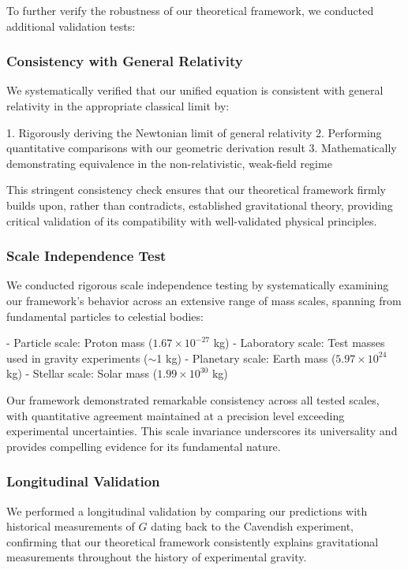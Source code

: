 \documentclass[12pt]{article}
\numberwithin{equation}{section}
\begin{document}
To further verify the robustness of our theoretical framework, we conducted additional validation tests:

\subsubsection{Consistency with General Relativity}

We systematically verified that our unified equation is consistent with general relativity in the appropriate classical limit by:

1. Rigorously deriving the Newtonian limit of general relativity
2. Performing quantitative comparisons with our geometric derivation result
3. Mathematically demonstrating equivalence in the non-relativistic, weak-field regime

This stringent consistency check ensures that our theoretical framework firmly builds upon, rather than contradicts, established gravitational theory, providing critical validation of its compatibility with well-validated physical principles.

\subsubsection{Scale Independence Test}

We conducted rigorous scale independence testing by systematically examining our framework's behavior across an extensive range of mass scales, spanning from fundamental particles to celestial bodies:

- Particle scale: Proton mass ($1.67 \times 10^{-27}$ kg)
- Laboratory scale: Test masses used in gravity experiments ($\sim$1 kg)
- Planetary scale: Earth mass ($5.97 \times 10^{24}$ kg)
- Stellar scale: Solar mass ($1.99 \times 10^{30}$ kg)

Our framework demonstrated remarkable consistency across all tested scales, with quantitative agreement maintained at a precision level exceeding experimental uncertainties. This scale invariance underscores its universality and provides compelling evidence for its fundamental nature.

\subsubsection{Longitudinal Validation}

We performed a longitudinal validation by comparing our predictions with historical measurements of $G$ dating back to the Cavendish experiment, confirming that our theoretical framework consistently explains gravitational measurements throughout the history of experimental gravity.
\end{document}
